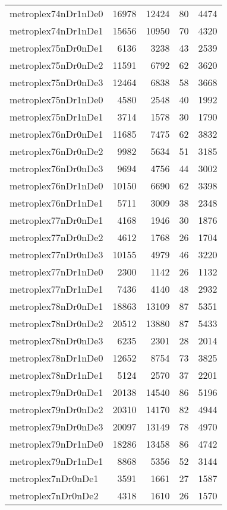 \begin{longtable}{lrrrr}
metroplex74nDr1nDe0 & 16978 & 12424 & 80 & 4474 \\
metroplex74nDr1nDe1 & 15656 & 10950 & 70 & 4320 \\
metroplex75nDr0nDe1 & 6136 & 3238 & 43 & 2539 \\
metroplex75nDr0nDe2 & 11591 & 6792 & 62 & 3620 \\
metroplex75nDr0nDe3 & 12464 & 6838 & 58 & 3668 \\
metroplex75nDr1nDe0 & 4580 & 2548 & 40 & 1992 \\
metroplex75nDr1nDe1 & 3714 & 1578 & 30 & 1790 \\
metroplex76nDr0nDe1 & 11685 & 7475 & 62 & 3832 \\
metroplex76nDr0nDe2 & 9982 & 5634 & 51 & 3185 \\
metroplex76nDr0nDe3 & 9694 & 4756 & 44 & 3002 \\
metroplex76nDr1nDe0 & 10150 & 6690 & 62 & 3398 \\
metroplex76nDr1nDe1 & 5711 & 3009 & 38 & 2348 \\
metroplex77nDr0nDe1 & 4168 & 1946 & 30 & 1876 \\
metroplex77nDr0nDe2 & 4612 & 1768 & 26 & 1704 \\
metroplex77nDr0nDe3 & 10155 & 4979 & 46 & 3220 \\
metroplex77nDr1nDe0 & 2300 & 1142 & 26 & 1132 \\
metroplex77nDr1nDe1 & 7436 & 4140 & 48 & 2932 \\
metroplex78nDr0nDe1 & 18863 & 13109 & 87 & 5351 \\
metroplex78nDr0nDe2 & 20512 & 13880 & 87 & 5433 \\
metroplex78nDr0nDe3 & 6235 & 2301 & 28 & 2014 \\
metroplex78nDr1nDe0 & 12652 & 8754 & 73 & 3825 \\
metroplex78nDr1nDe1 & 5124 & 2570 & 37 & 2201 \\
metroplex79nDr0nDe1 & 20138 & 14540 & 86 & 5196 \\
metroplex79nDr0nDe2 & 20310 & 14170 & 82 & 4944 \\
metroplex79nDr0nDe3 & 20097 & 13149 & 78 & 4970 \\
metroplex79nDr1nDe0 & 18286 & 13458 & 86 & 4742 \\
metroplex79nDr1nDe1 & 8868 & 5356 & 52 & 3144 \\
metroplex7nDr0nDe1 & 3591 & 1661 & 27 & 1587 \\
metroplex7nDr0nDe2 & 4318 & 1610 & 26 & 1570 \\

\end{longtable}
